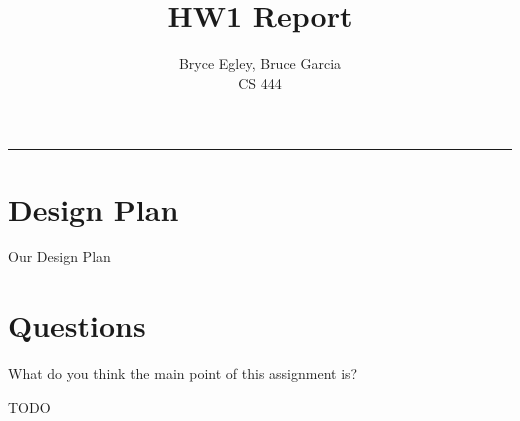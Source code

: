 \documentclass{article}
\newenvironment{question}[2][Question]{\begin{trivlist}
\item[\hskip \labelsep {\bfseries #1}\hskip \labelsep {\bfseries #2.}]}{\end{trivlist}}
\begin{document}

\title{HW1 Report} %
\author{Bryce Egley, Bruce Garcia\\CS 444} %

\maketitle
\hrule


%
%

\section*{Design Plan}
Our Design Plan
\newline

\section*{Questions}

\begin{question}{1}
What do you think the main point of this assignment is?
\end{question}
TODO


\vspace{0.25in} %
\end{document}
